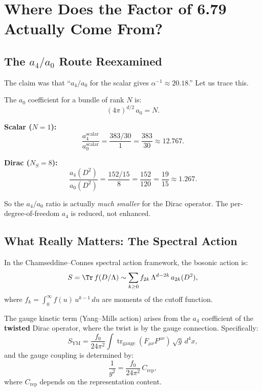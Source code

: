\documentclass[12pt,a4paper]{article}
\theoremstyle{definition}
\DeclareMathOperator{\tr}{tr}
\begin{document}
\section{Where Does the Factor of 6.79 Actually Come From?}
\label{sec:discussion}

\subsection{The $a_4/a_0$ Route Reexamined}

The claim was that ``$a_4/a_0$ for the scalar gives $\alpha^{-1}
\approx 20.18$.''  Let us trace this.

The $a_0$ coefficient for a bundle of rank $N$ is:
\begin{equation}
(4\pi)^{d/2}\,a_0 = N.
\end{equation}

\noindent\textbf{Scalar ($N = 1$):}
\begin{equation}
\frac{a_4^{\text{scalar}}}{a_0^{\text{scalar}}}
= \frac{383/30}{1} = \frac{383}{30} \approx 12.767.
\end{equation}

\noindent\textbf{Dirac ($N_S = 8$):}
\begin{equation}
\frac{a_4(D^2)}{a_0(D^2)} = \frac{152/15}{8}
= \frac{152}{120} = \frac{19}{15} \approx 1.267.
\end{equation}

So the $a_4/a_0$ ratio is actually \emph{much smaller} for the Dirac
operator.  The per-degree-of-freedom $a_4$ is reduced, not enhanced.


\subsection{What Really Matters: The Spectral Action}

In the Chamseddine--Connes spectral action framework, the bosonic
action is:
\begin{equation}
S = \Tr\,f(D/\Lambda) \sim \sum_{k \geq 0}
f_{2k}\,\Lambda^{d-2k}\,a_{2k}(D^2),
\end{equation}
where $f_k = \int_0^\infty f(u)\,u^{k-1}\,du$ are moments of the
cutoff function.

The gauge kinetic term (Yang--Mills action) arises from the $a_4$
coefficient of the \textbf{twisted} Dirac operator, where the twist
is by the gauge connection.  Specifically:
\begin{equation}
S_{\text{YM}} = \frac{f_0}{24\pi^2}\int
\tr_{\text{gauge}}(F_{\mu\nu}F^{\mu\nu})\,\sqrt{g}\,d^4x,
\end{equation}
and the gauge coupling is determined by:
\begin{equation}
\frac{1}{g^2} = \frac{f_0}{24\pi^2}\,C_{\text{rep}},
\end{equation}
where $C_{\text{rep}}$ depends on the representation content.
\end{document}
